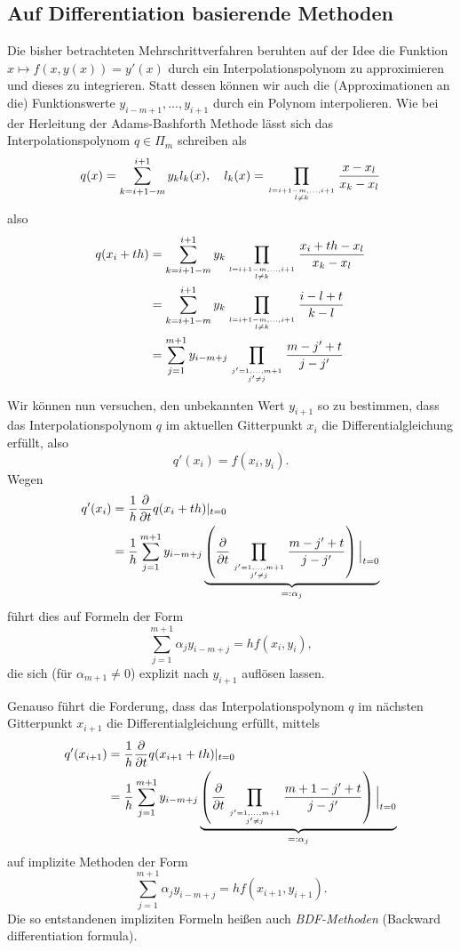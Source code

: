 \documentclass[
]{mycourse}
\theoremstyle{mythm}
\theoremstyle{break}
\begin{document}
\subsection{Auf Differentiation basierende Methoden}

Die bisher betrachteten Mehrschrittverfahren beruhten auf der Idee die Funktion $x\mapsto f(x,y(x))=y'(x)$
durch ein Interpolationspolynom zu approximieren und dieses zu integrieren. 
Statt dessen können wir auch die (Approximationen an die) Funktionswerte
$y_{i-m+1},\ldots,y_{i+1}$ durch ein Polynom interpolieren. 
Wie bei der Herleitung der Adams-Bashforth Methode lässt sich das Interpolationspolynom 
$q\in \Pi_m$
schreiben als
\[
q(x)=\sum_{k=i+1-m}^{i+1} y_k l_k(x), \quad l_k(x)=\prod_{l=i+1-m,\ldots,i+1 \atop l\neq k} \frac{x-x_l}{x_k-x_l}
\]
also
\begin{align*}
q(x_i+th)& =\sum_{k=i+1-m}^{i+1} y_k \prod_{l=i+1-m,\ldots,i+1 \atop l\neq k} \frac{x_i + th -x_l}{x_k-x_l}\\
&=\sum_{k=i+1-m}^{i+1} y_k \prod_{l=i+1-m,\ldots,i+1 \atop l\neq k} \frac{i-l+t}{k-l}\\
&=\sum_{j=1}^{m+1} y_{i-m+j} \prod_{j'=1,\ldots,m+1 \atop j'\neq j} \frac{m-j'+t}{j-j'}
\end{align*}

Wir können nun versuchen, den unbekannten Wert $y_{i+1}$ so zu bestimmen, 
dass das Interpolationspolynom $q$ im aktuellen Gitterpunkt $x_i$ 
die Differentialgleichung erfüllt, also
\[
q'(x_i)=f(x_i,y_i).
\]
Wegen
\begin{align*}
q'(x_i)&=\frac{1}{h} \frac{\partial}{\partial t} q(x_i+th)|_{t=0}\\
&=\frac{1}{h} \sum_{j=1}^{m+1} y_{i-m+j} \underbrace{\left( \frac{\partial}{\partial t}  \prod_{j'=1,\ldots,m+1 \atop j'\neq j}
 \frac{m-j'+t}{j-j'}\right)\Big|_{t=0}}_{=:\alpha_j}
\end{align*}
führt dies auf Formeln der Form
\[
\sum_{j=1}^{m+1} \alpha_j  y_{i-m+j} = h f(x_i,y_i),
\]
die sich (für $\alpha_{m+1}\neq 0$) explizit nach $y_{i+1}$ auflösen lassen.

Genauso führt die Forderung, dass das Interpolationspolynom $q$ im nächsten Gitterpunkt $x_{i+1}$ 
die Differentialgleichung erfüllt, mittels
\begin{align*}
q'(x_{i+1})&=\frac{1}{h} \frac{\partial}{\partial t} q(x_{i+1}+th)|_{t=0}\\
&=\frac{1}{h} \sum_{j=1}^{m+1} y_{i-m+j} \underbrace{\left( \frac{\partial}{\partial t}  \prod_{j'=1,\ldots,m+1 \atop j'\neq j}
 \frac{m+1-j'+t}{j-j'}\right)\Big|_{t=0}}_{=:\alpha_j}
\end{align*}
auf implizite Methoden der Form
\[
\sum_{j=1}^{m+1} \alpha_j  y_{i-m+j} = h f(x_{i+1},y_{i+1}).
\]
Die so entstandenen impliziten Formeln heißen auch \emph{BDF-Methoden} (Backward differentiation formula).
\end{document}

